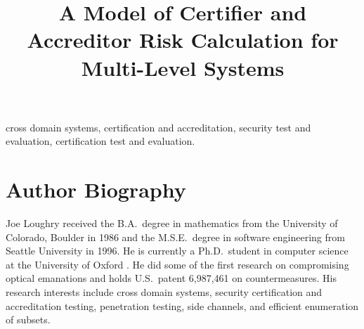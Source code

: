 \documentclass[10pt,letterpaper,conference]{IEEEtran}
\begin{document}
\title{A Model of Certifier and Accreditor Risk Calculation for Multi-Level Systems}

\author{
}

\maketitle

\begin{abstract}
	
\end{abstract}

\def\IEEEkeywordsname{Index Terms}


\begin{IEEEkeywords}
	cross domain systems, certification and accreditation,
	security test and evaluation, certification test and evaluation.
\end{IEEEkeywords}

\IEEEpeerreviewmaketitle

\section{Author Biography}

Joe Loughry received the B.A.\ degree in mathematics from the University of Colorado,
Boulder in 1986 and the M.S.E.\ degree in software engineering from Seattle University
in 1996.  He is currently a Ph.D.\ student in computer science at the University of
Oxford \cite{Loughry2012b}.  He did some of the first research on compromising optical
emanations and holds U.S.\ patent 6,987,461 on countermeasures.  His research interests
include cross domain systems, security certification and accreditation testing,
penetration testing, side channels, and efficient enumeration of subsets.
\end{document}

